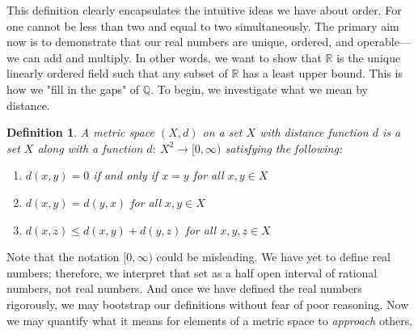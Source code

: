 \documentclass{article}
\newtheorem{defn}{Definition}[section]
\numberwithin{equation}{section}
\begin{document}
    This definition clearly encapsulates the intuitive ideas we have about order. For one cannot be less than two and equal to two
    simultaneously. The primary aim now is to demonstrate that our real numbers are unique, ordered, and operable---we can add and multiply.
    In other words, we want to show that $\mathbb{R}$ is the unique linearly ordered field such that any subset of $\mathbb{R}$ has a least upper bound. This is how
    we "fill in the gaps" of $\mathbb{Q}$. To begin, we investigate what we mean by distance.
    \begin{defn}
        A metric space $(X,d)$ on a set $X$ with distance function $d$ is a set $X$ along with a function $d: \ X^{2} \to [0, \infty)$ satisfying the following:
        \begin{enumerate}
            \item $d(x, y)=0$ if and only if $x=y$ for all $x,y \in X$
            \item $d(x,y)=d(y,x)$ for all $x,y \in X$
            \item $d(x,z) \leq d(x,y) + d(y,z)$ for all $x,y,z \in X$
        \end{enumerate}
    \end{defn}
    Note that the notation $[0, \infty)$ could be misleading. We have yet to define real numbers; therefore, we interpret that set 
    as a half open interval of rational numbers, not real numbers. And once we have defined the real numbers rigorously, we may bootstrap our definitions
    without fear of poor reasoning. Now we may quantify what it means for elements of a metric space to \emph{approach}
    others.
\end{document}
